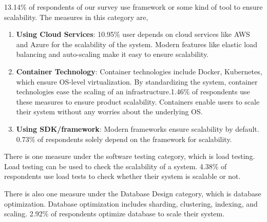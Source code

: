 13.14\% of respondents of our survey use framework or some kind of tool to ensure scalability. The measures in this category are,
\begin{enumerate}[label=(\alph*)]

    \item \textbf{Using Cloud Services}: 10.95\% user depends on cloud services like AWS and Azure for the scalability of the system. Modern features like elastic load balancing and auto-scaling make it easy to ensure scalability.
    
    \item \textbf{Container Technology}: Container technologies include Docker, Kubernetes, which ensure OS-level virtualization. By standardizing the system, container technologies ease the scaling of an infrastructure.1.46\% of respondents use these measures to ensure product scalability. Containers enable users to scale their system without any worries about the underlying OS.
    
    \item \textbf{Using SDK/framework}: Modern frameworks ensure scalability by default. 0.73\% of respondents solely depend on the framework for scalability.
  
\end{enumerate}
 
 
There is one measure under the software testing category, which is load testing. Load testing can be used to check the scalability of a system. 4.38\% of respondents use load tests to check whether their system is scalable or not.

There is also one measure under the Database Design category, which is database optimization. Database optimization includes sharding, clustering, indexing, and scaling. 2.92\% of respondents optimize database to scale their system.
